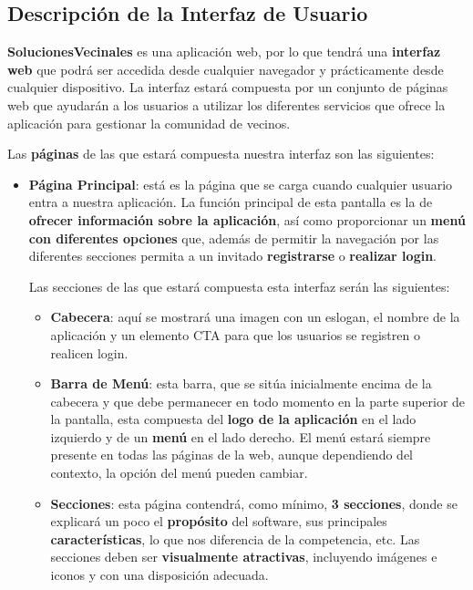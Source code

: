 \appendix

\begin{appendices}
	
\section{Descripción de la Interfaz de Usuario}
\label{sec:apenA}
\textbf{SolucionesVecinales} es una aplicación web, por lo que tendrá una \textbf{interfaz web} que podrá ser accedida desde cualquier navegador y prácticamente desde cualquier dispositivo. La interfaz estará compuesta por un conjunto de páginas web que ayudarán a los usuarios a utilizar los diferentes servicios que ofrece la aplicación para gestionar la comunidad de vecinos. 

Las \textbf{páginas} de las que estará compuesta nuestra interfaz son las siguientes:

\begin{itemize}
	\item \textbf{Página Principal}: está es la página que se carga cuando cualquier usuario entra a nuestra aplicación. La función principal de esta pantalla es la de \textbf{ofrecer información sobre la aplicación}, así como proporcionar un\textbf{ menú con diferentes opciones} que, además de permitir la navegación por las diferentes secciones permita a un invitado \textbf{registrarse} o \textbf{realizar \gls{login}}.
	
	Las secciones de las que estará compuesta esta interfaz serán las siguientes:
	
	\begin{itemize}
		\item \textbf{Cabecera}: aquí se mostrará una imagen con un eslogan, el nombre de la aplicación y un elemento \gls{CTA} para que los usuarios se registren o realicen login.
		
		\item \textbf{Barra de Menú}: esta barra, que se sitúa inicialmente encima de la cabecera y que debe permanecer en todo momento en la parte superior de la pantalla, esta compuesta del \textbf{logo de la aplicación} en el lado izquierdo y de un \textbf{menú} en el lado derecho. El menú estará siempre presente en todas las páginas de la web, aunque dependiendo del contexto, la opción del menú pueden cambiar.
		
		\item \textbf{Secciones}: esta página contendrá, como mínimo, \textbf{3 secciones}, donde se explicará un poco el \textbf{propósito} del software, sus principales \textbf{características}, lo que nos diferencia de la competencia, etc. Las secciones deben ser \textbf{visualmente atractivas}, incluyendo imágenes e iconos y con una disposición adecuada. 
		

\end{itemize}
\end{itemize}
\end{appendices}
